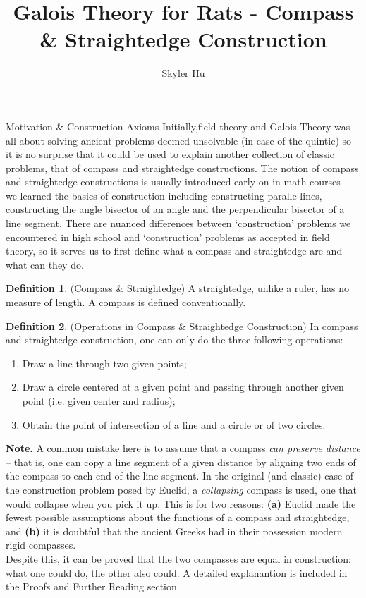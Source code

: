 \documentclass[12pt]{article}
\title{Galois Theory for Rats - Compass \& Straightedge Construction}
\author{Skyler Hu}
\theoremstyle{definition}
\newtheorem{definition}{Definition}[section]
\theoremstyle{definition}
\theoremstyle{definition}
\theoremstyle{definition}
\theoremstyle{definition}
\theoremstyle{definition}
\theoremstyle{definition}
\begin{document}
\linespread{1.05}
\maketitle
\newpage
\tableofcontents
\newpage

\begin{section}{Motivation \& Construction Axioms}
    Initially,field theory and Galois Theory was all about solving ancient problems deemed unsolvable (in case of the quintic) so it is
    no surprise that it could be used to explain another collection of classic problems, that of compass and straightedge constructions.
    The notion of compass and straightedge constructions is usually introduced early on in math courses -- we learned the basics of construction
    including constructing paralle lines, constructing the angle bisector of an angle and the perpendicular bisector of a line segment. There are nuanced differences between 
    `construction' problems we encountered in high school and `construction' problems as accepted in field theory, so it serves us to first define 
    what a compass and straightedge are and what can they do.

    \begin{definition}{(Compass \& Straightedge)}
        A straightedge, unlike a ruler, has no measure of length. A compass is defined conventionally.
    \end{definition}

    \begin{definition}{(Operations in Compass \& Straightedge Construction)}
        In compass and straightedge construction, one can only do the three following operations:
        \begin{enumerate}
            \item Draw a line through two given points;
            \item Draw a circle centered at a given point and passing through another given point (i.e. given center and radius);
            \item Obtain the point of intersection of a line and a circle or of two circles.
        \end{enumerate}
        \textbf{Note.} A common mistake here is to assume that a compass \textit{can preserve distance} -- that is, one can copy a line segment of a 
        given distance by aligning two ends of the compass to each end of the line segment. In the original (and classic) case of the construction problem
        posed by Euclid, a \textit{collapsing} compass is used, one that would collapse when you pick it up. This is for two reasons: \textbf{(a)} Euclid
        made the fewest possible assumptions about the functions of a compass and straightedge, and \textbf{(b)} it is doubtful that the ancient Greeks had 
        in their possession modern rigid compasses. \\
        Despite this, it can be proved that the two compasses are equal in construction: what one could do, the other also could. A detailed explanantion is
        included in the Proofs and Further Reading section.
    \end{definition}


\end{section}
\end{document}
